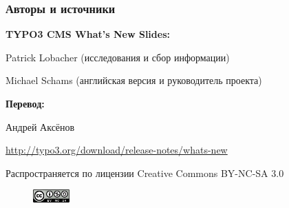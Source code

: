 \begin{frame}[fragile]
	\frametitle{Авторы и источники}

	\centerline{\textbf{TYPO3 CMS What's New Slides:}}
	\centerline{Patrick Lobacher (исследования и сбор информации)}
	\centerline{Michael Schams (английская версия и руководитель проекта)}

	\begin{center}
		\centerline{\textbf{Перевод:}}
		\centerline{Андрей Аксёнов}
	\end{center}

	\smaller\begin{center}\url{http://typo3.org/download/release-notes/whats-new}\end{center}\normalsize

	\smaller\begin{center}Распространяется по лицензии Creative Commons BY-NC-SA 3.0\end{center}\normalsize
	\begin{figure}\vspace*{-0.2cm}
		\includegraphics[width=1.4cm]{Images/SourcesAndAuthors/CreativeCommons-BY-NC-SA.png}
	\end{figure}

\end{frame}


